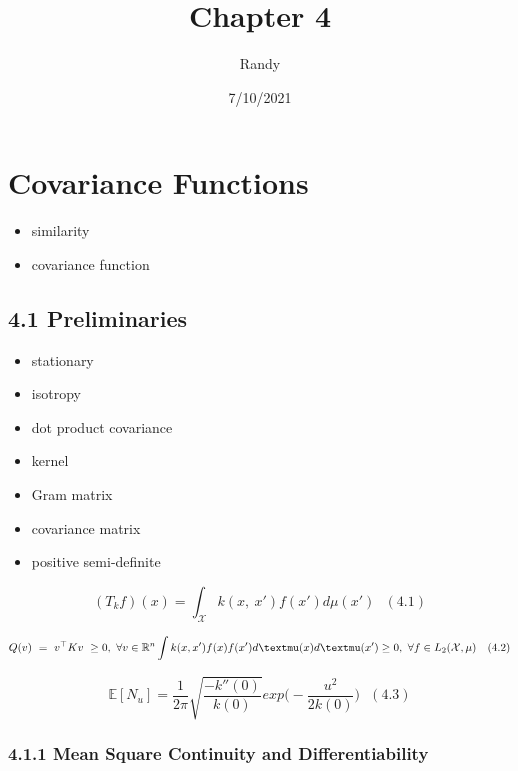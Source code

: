 \documentclass[
]{article}
\title{Chapter 4}
\author{Randy}
\date{7/10/2021}
\providecommand{\tightlist}{%
  \setlength{\itemsep}{0pt}\setlength{\parskip}{0pt}}
\begin{document}
\maketitle

\hypertarget{covariance-functions}{%
\section{Covariance Functions}\label{covariance-functions}}

\begin{itemize}
\tightlist
\item
  similarity
\item
  covariance function
\end{itemize}

\hypertarget{preliminaries}{%
\subsection{4.1 Preliminaries}\label{preliminaries}}

\begin{itemize}
\item
  stationary
\item
  isotropy
\item
  dot product covariance
\item
  kernel
\item
  Gram matrix
\item
  covariance matrix
\item
  positive semi-definite
\end{itemize}

\[
(T_kf)(x) = \int_{\mathcal{X}} k(x,\ x')f(x')d\mu(x') \ \ \ (4.1)
\]

\[
Q(v)\ =\ v^{\top}Kv\ \geq 0,\ \forall v \in \mathbb{R}^n\\
\int k(x, x')f(x)f(x') dµ(x) dµ(x') \geq 0,\ \forall f \in L_2(\mathcal{X}, \mu) \ \ \ (4.2)
\]

\[
\mathbb {E}[N_u] = \frac{1} {2\pi}\sqrt{\frac{-k''(0)}{k(0)}}exp\Big(-\frac{u^2}{2k(0)}\Big) \ \ \ (4.3)
\]

\hypertarget{mean-square-continuity-and-differentiability}{%
\subsubsection{4.1.1 Mean Square Continuity and
Differentiability}\label{mean-square-continuity-and-differentiability}}
\end{document}

